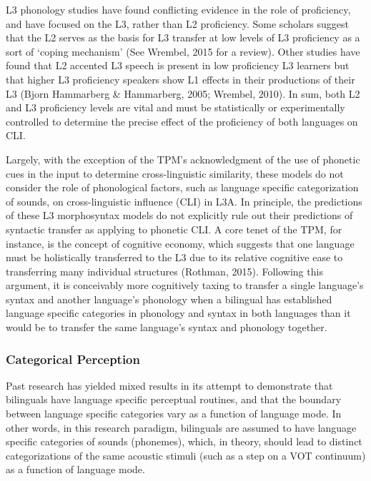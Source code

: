 \documentclass[
  man]{apa6}
\begin{document}
L3 phonology studies have found conflicting evidence in the role of proficiency, and have focused on the L3, rather than L2 proficiency.
Some scholars suggest that the L2 serves as the basis for L3 transfer at low levels of L3 proficiency as a sort of `coping mechanism' (See Wrembel, 2015 for a review).
Other studies have found that L2 accented L3 speech is present in low proficiency L3 learners but that higher L3 proficiency speakers show L1 effects in their productions of their L3 (Bjorn Hammarberg \& Hammarberg, 2005; Wrembel, 2010).
In sum, both L2 and L3 proficiency levels are vital and must be statistically or experimentally controlled to determine the precise effect of the proficiency of both languages on CLI.

Largely, with the exception of the TPM's acknowledgment of the use of phonetic cues in the input to determine cross-linguistic similarity, these models do not consider the role of phonological factors, such as language specific categorization of sounds, on cross-linguistic influence (CLI) in L3A. In principle, the predictions of these L3 morphosyntax models do not explicitly rule out their predictions of syntactic transfer as applying to phonetic CLI. A core tenet of the TPM, for instance, is the concept of cognitive economy, which suggests that one language must be holistically transferred to the L3 due to its relative cognitive ease to transferring many individual structures (Rothman, 2015). Following this argument, it is conceivably more cognitively taxing to transfer a single language's syntax and another language's phonology when a bilingual has established language specific categories in phonology and syntax in both languages than it would be to transfer the same language's syntax and phonology together.

\hypertarget{categorical-perception}{%
\subsubsection{Categorical Perception}\label{categorical-perception}}

Past research has yielded mixed results in its attempt to demonstrate that bilinguals have language specific perceptual routines, and that the boundary between language specific categories vary as a function of language mode. In other words, in this research paradigm, bilinguals are assumed to have language specific categories of sounds (phonemes), which, in theory, should lead to distinct categorizations of the same acoustic stimuli (such as a step on a VOT continuum) as a function of language mode.
\end{document}
